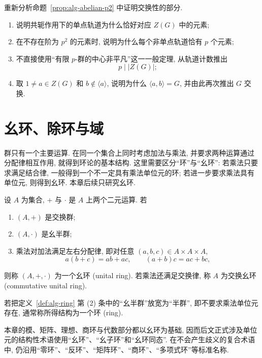 \documentclass[usesamecnt, thmcnt=section, lang=cn, newtx, 10pt, scheme=chinese]{elegantbook}
\begin{document}
\begin{exercise}\label{ex:alg-abelian-essential}
重新分析命题~\ref{prop:alg-abelian-p2} 中证明交换性的部分.
\begin{enumerate}[label=\rm(\arabic*)]
  \item 说明共轭作用下的单点轨道为什么恰好对应 $Z(G)$ 中的元素;
  \item 在不存在阶为 $p^2$ 的元素时, 说明为什么每个非单点轨道恰有 $p$ 个元素;
  \item 不直接使用``有限 $p$-群的中心非平凡''这一一般定理, 从轨道计数推出
  \[
   p\mid |Z(G)|;
  \]
  \item 取 $1\neq a\in Z(G)$ 和 $b\notin\langle a\rangle$, 说明为什么 $\langle a,b\rangle=G$, 并由此再次推出 $G$ 交换.
\end{enumerate}
\end{exercise}

\section{幺环、除环与域}

群只有一个主要运算. 在同一个集合上同时考虑加法与乘法, 并要求两种运算通过分配律相互作用, 就得到环论的基本结构. 这里需要区分``环''与``幺环'': 若乘法只要求满足结合律, 一般得到一个不一定具有乘法单位元的环; 若进一步要求乘法具有单位元, 则得到幺环. 本章后续只研究幺环.

\begin{definition}[幺环]\label{def:alg-ring}
设 $A$ 为集合, $+$ 与 $\cdot$ 是 $A$ 上两个二元运算. 若
\begin{enumerate}[label=\rm(\arabic*)]
  \item $(A,+)$ 是交换群;
  \item $(A,\cdot)$ 是幺半群;
  \item 乘法对加法满足左右分配律, 即对任意 $(a,b,c)\in A\times A\times A$,
  \[
   a(b+c)=ab+ac,
   \qquad
   (a+b)c=ac+bc,
  \]
\end{enumerate}
则称 $(A,+,\cdot)$ 为一个{\color{blue}幺环 (unital ring)}. 若乘法还满足交换律, 称 $A$ 为{\color{blue}交换幺环 (commutative unital ring)}.
\end{definition}

\begin{knowledge}[环与幺环的术语]
若把定义~\ref{def:alg-ring} 第 (2) 条中的``幺半群''放宽为``半群'', 即不要求乘法单位元存在, 通常称所得结构为一个{\color{blue}环 (ring)}. 

本章的模、矩阵、理想、商环与代数部分都以幺环为基础, 因而后文正式涉及单位元的结构性术语使用``幺环''、``幺子环''和``幺环同态''. 在不会产生歧义的复合术语中, 仍沿用``零环''、``反环''、``矩阵环''、``商环''、``多项式环''等标准名称.
\end{knowledge}
\end{document}
